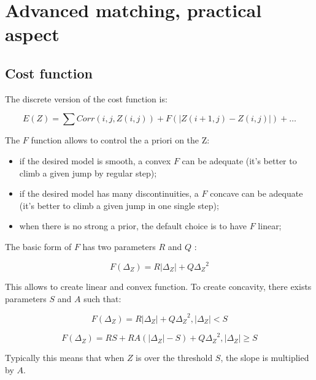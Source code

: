 \chapter{Advanced matching, practical aspect}


\section{Cost function}


The discrete version of the cost function is:


\begin{equation}
   E(Z) = \sum Corr(i,j,Z(i,j)) + F(|Z(i+1,j)-Z(i,j)|)  + \dots
\end{equation}

The $F$ function allows to control the a priori on the Z:

\begin{itemize}
   \item  if the desired model is smooth, a convex   $F$  can be adequate (it's better to
          climb a given jump by regular step);

   \item  if  the desired model has many discontinuities, a $F$   concave can be adequate
          (it's better to climb a given jump in one single step);

   \item when there is no strong a prior, the  default choice is to have $F$ linear;

\end{itemize}


The basic form of $F$ has two parameters $R$ and $Q$ :

\begin{equation}
   F(\Delta_Z) =  R |\Delta_Z| + Q {\Delta_Z}^2
\end{equation}


This allows to create linear and convex function. To create concavity,
there exists parameters $S$ and $A$ such that:

\begin{equation}
   F(\Delta_Z) =  R |\Delta_Z| + Q {\Delta_Z}^2 ,  |\Delta_Z| < S
\end{equation}

\begin{equation}
   F(\Delta_Z) =  R S +   R A (|\Delta_Z|-S)   + Q {\Delta_Z}^2 ,  |\Delta_Z| \geq  S
\end{equation}


Typically this means that when $Z$ is over the threshold $S$, the slope is multiplied by $A$.

